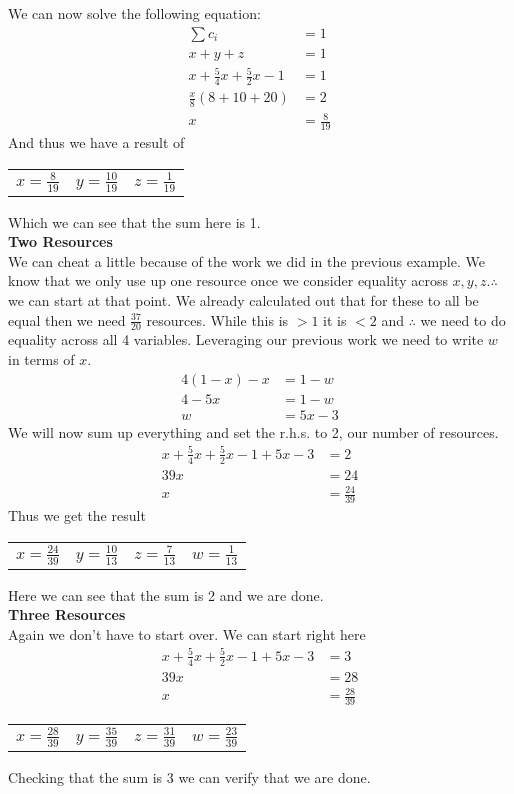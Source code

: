 \documentclass[12pt,letter]{article}
\begin{document}
We can now solve the following equation:
\begin{align*}
    \sum c_i &= 1\\
    x + y + z &= 1\\
    x + \frac54x + \frac52x - 1 &= 1\\
    \frac{x}{8}(8 + 10 + 20) &= 2 \\
    x &= \frac{8}{19}
\end{align*}
And thus we have a result of 
\\
\begin{figure*}[h!]
\centering
\begin{tabular}{c c c}
    $x=\frac{8}{19}$ & $y=\frac{10}{19}$ & $z=\frac{1}{19}$
\end{tabular}
\end{figure*}
Which we can see that the sum here is 1.
\\
\large\textbf{Two Resources}\normalsize
\\
We can cheat a little because of the work we did in the previous example. We know
that we only use up one resource once we consider equality across $x,y,z. 
\therefore$ we can start at that point. We already calculated out that for these
to all be equal then we need $\frac{37}{20}$ resources. While this is $> 1$ it
is $<2$ and $\therefore$ we need to do equality across all 4 variables. Leveraging
our previous work we need to write $w$ in terms of $x$.
\begin{align*}
    4(1-x) - x &= 1-w\\
    4 - 5x &= 1 - w\\
    w &= 5x - 3
\end{align*}
We will now sum up everything and set the r.h.s. to 2, our number of resources.
\begin{align*}
    x + \frac54x + \frac52x - 1 + 5x - 3 &= 2\\
    39x &= 24\\
    x &= \frac{24}{39}
\end{align*}
Thus we get the result
\begin{figure*}[h!]
\centering
\begin{tabular}{c c c c}
    $x=\frac{24}{39}$ & $y=\frac{10}{13}$ & $z=\frac{7}{13}$ & $w=\frac{1}{13}$
\end{tabular}
\end{figure*}
Here we can see that the sum is 2 and we are done. 
\\
\large\textbf{Three Resources}\normalsize
\\
Again we don't have to start over. We can start right here
\begin{align*}
    x + \frac54x + \frac52x - 1 + 5x - 3 &= 3\\
    39x &= 28\\
    x &= \frac{28}{39}
\end{align*}
\begin{figure*}[h!]
\centering
\begin{tabular}{c c c c}
    $x=\frac{28}{39}$ & $y=\frac{35}{39}$ & $z=\frac{31}{39}$ & $w=\frac{23}{39}$
\end{tabular}
\end{figure*}
Checking that the sum is 3 we can verify that we are done.
\end{document}
